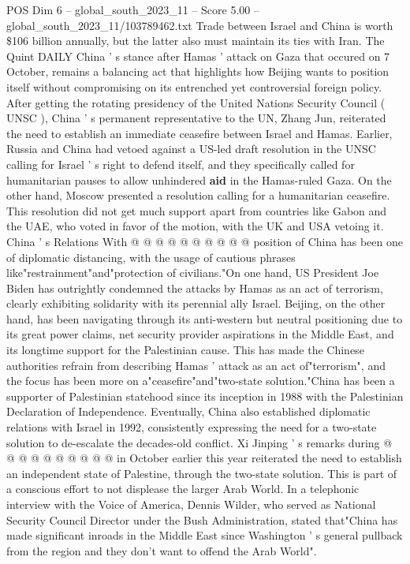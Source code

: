 \begin{textsample}{POS Dim 6 – global\_south\_2023\_11 – Score 5.00 – global\_south\_2023\_11/103789462.txt}  \label{ex:f6_pos_259}
Trade between Israel and China is worth \$106 billion annually, but the latter also must maintain its ties with Iran.
The Quint DAILY China ' s stance after Hamas ' attack on Gaza that occured on 7 October, remains a balancing act that highlights how Beijing wants to position itself without compromising on its entrenched yet controversial foreign policy.
After getting the rotating presidency of the United Nations Security Council ( UNSC ), China ' s permanent representative to the UN, Zhang Jun, reiterated the need to establish an immediate ceasefire between Israel and Hamas.
Earlier, Russia and China had vetoed against a US-led draft resolution in the UNSC calling for Israel ' s right to defend itself, and they specifically called for humanitarian pauses to allow unhindered \textbf{aid} in the Hamas-ruled Gaza.
On the other hand, Moscow presented a resolution calling for a humanitarian ceasefire.
This resolution did not get much support apart from countries like Gabon and the UAE, who voted in favor of the motion, with the UK and USA vetoing it.
China ' s Relations With @ @ @ @ @ @ @ @ @ @ position of China has been one of diplomatic distancing, with the usage of cautious phrases like"restrainment"and"protection of civilians."On one hand, US President Joe Biden has outrightly condemned the attacks by Hamas as an act of terrorism, clearly exhibiting solidarity with its perennial ally Israel.
Beijing, on the other hand, has been navigating through its anti-western but neutral positioning due to its great power claims, net security provider aspirations in the Middle East, and its longtime support for the Palestinian cause.
This has made the Chinese authorities refrain from describing Hamas ' attack as an act of"terrorism", and the focus has been more on a"ceasefire"and"two-state solution."China has been a supporter of Palestinian statehood since its inception in 1988 with the Palestinian Declaration of Independence.
Eventually, China also established diplomatic relations with Israel in 1992, consistently expressing the need for a two-state solution to de-escalate the decades-old conflict.
Xi Jinping ' s remarks during @ @ @ @ @ @ @ @ @ @ in October earlier this year reiterated the need to establish an independent state of Palestine, through the two-state solution.
This is part of a conscious effort to not displease the larger Arab World.
In a telephonic interview with the Voice of America, Dennis Wilder, who served as National Security Council Director under the Bush Administration, stated that"China has made significant inroads in the Middle East since Washington ' s general pullback from the region and they don't want to offend the Arab World".

\end{textsample}
